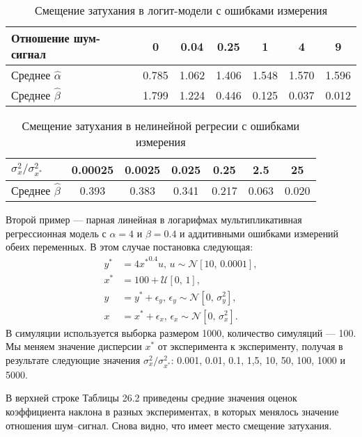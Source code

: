 \begin{table}[h!]
\caption{\label{tab:26.1 } Смещение затухания в логит-модели с ошибками измерения}
\begin{center}
\begin{tabular}{lcccccc}
\hline
\hline
Отношение шум-сигнал & 0 & 0.04 & 0.25 & 1 & 4 & 9 \\
\hline
Среднее $\hat{\alpha}$ &   0.785 & 1.062 & 1.406 & 1.548 & 1.570 & 1.596  \\
Среднее $\hat{\beta}$ &    1.799 & 1.224 & 0.446 & 0.125 & 0.037 & 0.012 \\
\hline
\hline
\end{tabular}
\end{center}
\end{table}

\begin{table}[h!]
\caption{\label{tab:26.2 } Смещение затухания в нелинейной регресии с ошибками измерения}
\begin{center}
\begin{tabular}{lcccccc}
\hline
\hline
$\sigma^2_x/\sigma^2_{x^*}$ & 0.00025 & 0.0025 & 0.025 & 0.25 & 2.5 & 25 \\
\hline
Среднее $\hat{\beta}$ &   0.393 & 0.383 & 0.341 & 0.217 & 0.063 & 0.020  \\
\hline
\end{tabular}
\end{center}
\end{table}

Второй пример –-- парная линейная в логарифмах мультипликативная регрессионная модель с $\alpha=4$ и $\beta=0.4$ и аддитивными ошибками измерений обеих переменных. В этом случае постановка следующая:
\begin{align*}
y^* &= 4{x^*}^{0.4}u, \, u \sim \mathcal{N}[10, \, 0.0001], \\
x^* &= 100+ \mathcal{U}[0, \, 1], \\
y &= y^*+ \epsilon_y, \, \epsilon_y \sim \mathcal{N}[0, \, \sigma^2_y], \\
x &= x^*+ \epsilon_x, \, \epsilon_x \sim \mathcal{N}[0, \, \sigma^2_x].
\end{align*}
В симуляции используется выборка размером 1000, количество симуляций --- 100. Мы меняем значение дисперсии $x^*$ от эксперимента к эксперименту, получая в результате следующие значения $\sigma^2_{x} / \sigma^2_{x^*}$: 0.001, 0.01, 0.1, 1,5, 10, 50, 100, 1000 и 5000.

В верхней строке Таблицы 26.2 приведены средние значения оценок коэффициента наклона в разных экспериментах, в которых менялось значение отношения шум--сигнал. Снова видно, что имеет место смещение затухания.

